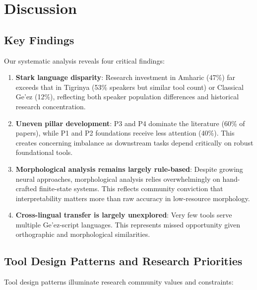 \documentclass[12pt,a4paper]{article}
\theoremstyle{plain}
\theoremstyle{definition}
\begin{document}

\section{Discussion}
\label{sec:discussion}

\subsection{Key Findings}

Our systematic analysis reveals four critical findings:

\begin{enumerate}
    \item \textbf{Stark language disparity}: Research investment in Amharic (47\%) far exceeds that in Tigrinya (53\% speakers but similar tool count) or Classical Ge'ez (12\%), reflecting both speaker population differences and historical research concentration.

    \item \textbf{Uneven pillar development}: P3 and P4 dominate the literature (60\% of papers), while P1 and P2 foundations receive less attention (40\%). This creates concerning imbalance as downstream tasks depend critically on robust foundational tools.

    \item \textbf{Morphological analysis remains largely rule-based}: Despite growing neural approaches, morphological analysis relies overwhelmingly on hand-crafted finite-state systems. This reflects community conviction that interpretability matters more than raw accuracy in low-resource morphology.

    \item \textbf{Cross-lingual transfer is largely unexplored}: Very few tools serve multiple Ge'ez-script languages. This represents missed opportunity given orthographic and morphological similarities.
\end{enumerate}

\subsection{Tool Design Patterns and Research Priorities}
\label{subsec:tool_design}

Tool design patterns illuminate research community values and constraints:
\end{document}
